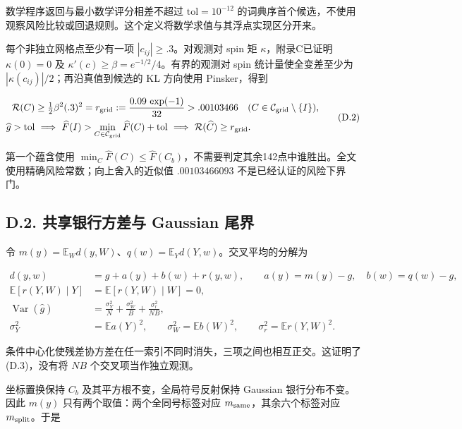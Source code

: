 \documentclass[11pt,a4paper]{article}
\begin{document}
数学程序返回与最小数学评分相差不超过 \(\mathrm{tol}=10^{-12}\)
的词典序首个候选，不使用观察风险比较或回退规则。这个定义将数学求值与其浮点实现区分开来。

每个非独立网格点至少有一项 \(|c_{ij}|\ge.3\)。对观测对 spin 矩
\(\kappa\)，附录C已证明 \(\kappa(0)=0\) 及
\(\kappa'(c)\ge\beta=e^{-1/2}/4\)。有界的观测对 spin
统计量使全变差至少为 \(|\kappa(c_{ij})|/2\)；再沿真值到候选的 KL
方向使用 Pinsker，得到

\[
\begin{aligned}
\mathcal R(C)&\ge\tfrac12\beta^2(.3)^2
=r_{\rm grid}:=\frac{0.09\,\exp(-1)}{32}>.00103466
 \quad(C\in\mathcal C_{\rm grid}\setminus\{I\}),\\
\widehat g>\mathrm{tol}
&\ \Longrightarrow\
\widehat F(I)>\min_{C\in\mathcal C_{\rm grid}}\widehat F(C)+\mathrm{tol}
\ \Longrightarrow\ \mathcal R(\widehat C)\ge r_{\rm grid}.
\end{aligned}
\tag{D.2}
\]

第一个蕴含使用
\(\min_C\widehat F(C)\le\widehat F(C_b)\)，不需要判定其余142点中谁胜出。全文使用精确风险常数；向上舍入的近似值
\(.00103466093\) 不是已经认证的风险下界门。

\subsection*{D.2. 共享银行方差与 Gaussian
尾界}\label{d.2.-ux5171ux4eabux94f6ux884cux65b9ux5deeux4e0e-gaussian-ux5c3eux754c}

令
\(m(y)=\mathbb E_Wd(y,W)\)、\(q(w)=\mathbb E_Yd(Y,w)\)。交叉平均的分解为

\[
\begin{aligned}
d(y,w)&=g+a(y)+b(w)+r(y,w),\qquad
a(y)=m(y)-g,\quad b(w)=q(w)-g,\\
\mathbb E[r(Y,W)\mid Y]&=\mathbb E[r(Y,W)\mid W]=0,\\
\operatorname{Var}(\widehat g)
&=\frac{\sigma_Y^2}{N}+\frac{\sigma_W^2}{B}+\frac{\sigma_r^2}{NB},\\
\sigma_Y^2&=\mathbb E a(Y)^2,\qquad
\sigma_W^2=\mathbb E b(W)^2,\qquad
\sigma_r^2=\mathbb E r(Y,W)^2.
\end{aligned}
\tag{D.3}
\]

条件中心化使残差协方差在任一索引不同时消失，三项之间也相互正交。这证明了
(D.3)，没有将 \(NB\) 个交叉项当作独立观测。

坐标置换保持 \(C_b\) 及其平方根不变，全局符号反射保持 Gaussian
银行分布不变。因此 \(m(y)\) 只有两个取值：两个全同号标签对应
\(m_{\rm same}\)，其余六个标签对应 \(m_{\rm split}\)。于是
\end{document}
